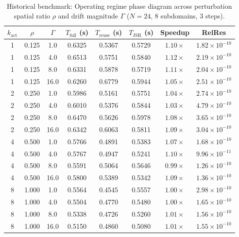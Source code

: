 \documentclass[preprint,12pt,3p]{elsarticle}
\begin{document}
\begin{table}[htbp]
\centering
\small
\caption{Historical benchmark: Operating regime phase diagram across perturbation spatial ratio $\rho$ and drift magnitude $\Gamma$ ($N=24$, 8 subdomains, 3 steps).}
\label{tab:pillar1_phase}
\begin{tabular}{cccccccc}
\toprule
$k_{\text{act}}$ & $\rho$ & $\Gamma$ & $T_{\text{full}}$ (s) & $T_{\text{reuse}}$ (s) & $T_{\text{JSR}}$ (s) & Speedup & RelRes \\
\midrule
1 & 0.125 & 1.0 & 0.6325 & 0.5367 & 0.5729 & $1.10\times$ & $1.82 \times 10^{-10}$ \\
1 & 0.125 & 4.0 & 0.6513 & 0.5751 & 0.5840 & $1.12\times$ & $2.19 \times 10^{-10}$ \\
1 & 0.125 & 8.0 & 0.6331 & 0.5878 & 0.5719 & $1.11\times$ & $2.04 \times 10^{-10}$ \\
1 & 0.125 & 16.0 & 0.6260 & 0.6779 & 0.5944 & $1.05\times$ & $2.51 \times 10^{-10}$ \\
2 & 0.250 & 1.0 & 0.5986 & 0.5161 & 0.5751 & $1.04\times$ & $2.74 \times 10^{-10}$ \\
2 & 0.250 & 4.0 & 0.6010 & 0.5376 & 0.5844 & $1.03\times$ & $4.79 \times 10^{-10}$ \\
2 & 0.250 & 8.0 & 0.6470 & 0.5626 & 0.5978 & $1.08\times$ & $3.65 \times 10^{-10}$ \\
2 & 0.250 & 16.0 & 0.6342 & 0.6063 & 0.5811 & $1.09\times$ & $3.04 \times 10^{-10}$ \\
4 & 0.500 & 1.0 & 0.5766 & 0.4891 & 0.5383 & $1.07\times$ & $1.68 \times 10^{-10}$ \\
4 & 0.500 & 4.0 & 0.5767 & 0.4947 & 0.5241 & $1.10\times$ & $9.96 \times 10^{-11}$ \\
4 & 0.500 & 8.0 & 0.5591 & 0.5064 & 0.5646 & $0.99\times$ & $1.26 \times 10^{-10}$ \\
4 & 0.500 & 16.0 & 0.5800 & 0.5389 & 0.5342 & $1.09\times$ & $1.36 \times 10^{-10}$ \\
8 & 1.000 & 1.0 & 0.5564 & 0.4545 & 0.5557 & $1.00\times$ & $2.98 \times 10^{-10}$ \\
8 & 1.000 & 4.0 & 0.5504 & 0.4770 & 0.5480 & $1.00\times$ & $1.65 \times 10^{-10}$ \\
8 & 1.000 & 8.0 & 0.5338 & 0.4726 & 0.5260 & $1.01\times$ & $1.56 \times 10^{-10}$ \\
8 & 1.000 & 16.0 & 0.5150 & 0.4860 & 0.5080 & $1.01\times$ & $1.55 \times 10^{-10}$ \\
\bottomrule
\end{tabular}
\end{table}
\end{document}
